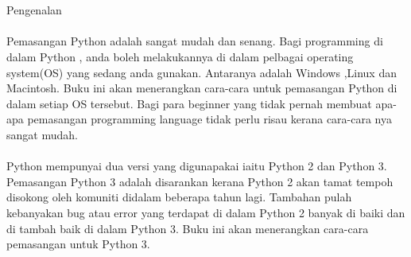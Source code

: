 \section{}
Pengenalan

\paragraph{}
	Pemasangan Python adalah sangat mudah dan senang. Bagi programming di dalam Python , anda boleh melakukannya di dalam pelbagai operating system(OS) yang sedang anda gunakan. Antaranya adalah Windows ,Linux dan Macintosh. Buku ini akan menerangkan cara-cara untuk pemasangan Python di dalam setiap OS tersebut. Bagi para beginner yang tidak pernah membuat apa-apa pemasangan programming language tidak perlu risau kerana cara-cara nya sangat mudah.
\paragraph{}
	Python mempunyai dua versi yang digunapakai iaitu Python 2 dan Python 3. Pemasangan Python 3 adalah disarankan kerana Python 2 akan tamat tempoh disokong oleh komuniti didalam beberapa tahun lagi. Tambahan pulah kebanyakan bug atau error yang terdapat di dalam Python 2 banyak di baiki dan di tambah baik di dalam Python 3. Buku ini akan menerangkan cara-cara pemasangan untuk Python 3.



